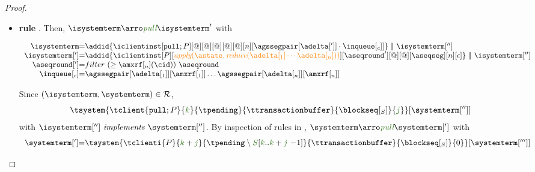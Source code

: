 \begin{proof}
\begin{itemize}
\begin{itemize}
				
				




							
							

					
	
	\item {\bf rule }. Then, $\isystemterm  \arroi{\pulltran} \isystemterm '$ with 
	
				\[\begin{array}{r@{=}l}
					\isystemterm & \addid{\iclientinst[\tpullins][@]
						[@]%
						[@][@][@][n][{\agssegpair[{\adelta[']}]}\cdot\inclient]}
								\ \bigpar \ \isystemterm['']
					\\
					\isystemterm['] & \addid{\iclientinst[P]
						 [\iapply{\known}{\ireduce{\adelta[_1]\cdots\adelta[_n]}}]
						 [\aseqround']
						 [@][@]
						 [{\receivebuffer}][n][\epsilon]}\ \bigpar \ \isystemterm['']	\\
					   \aseqround['] & filter\ (\geq \amxrf[_n](\cid)) \ \aseqround \\
						\inclient & \agssegpair[{\adelta[_1]}][{\amxrf[_1]}]\ldots \agssegpair[{\adelta[_n]}][{\amxrf[_n]}]
				  \end{array}
				\]
		
				Since $(\isystemterm,\systemterm)\in \mathcal{R}$,
				\[\tsystem{\tclient{\tpullins}{\tknown}{\tpending}{\ttransactionbuffer}{\tsent}{\treceivebuffer}}[{\systemterm['']}] \]
				with $\implements{\isystemterm['']}{\systemterm['']}$. By inspection of rules in \figref{}, 
				$\systemterm\arroi{\pulltran} \systemterm[']$ with
				\[\begin{array}{r@{=}l}
					\systemterm['] &  \tsystem{\tclienti{\tprogram}{\tknown+\treceivebuffer}{\tpending \setminus \queuemessage[\tknown .. \tknown + \treceivebuffer  {\ -1}]}{\ttransactionbuffer}{\tsent}{0}}[{\systemterm[''']}]	
				  \end{array}		
				\]
				

\end{itemize}
\end{itemize}
\end{proof}
